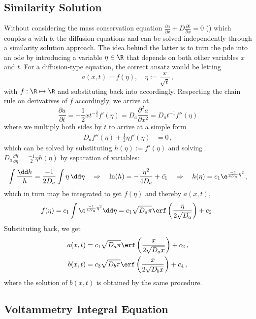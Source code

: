 \documentclass{prettytex/ox/mmsc-special-topic}
\begin{document}
  \subsection{Similarity Solution}
  Without considering the mass conservation equation $\frac{\partial a}{\partial x} + D \frac{\partial b}{\partial x} = 0$ () which couples $a$ with $b$, the diffusion equations  and  can be solved independently through a similarity solution approach.
  The idea behind the latter is to turn the \gls{pde} into an \gls{ode} by introducing a variable $\eta \in \R$ that depends on both other variables $x$ and $t$.
  For a diffusion-type equation, the correct ansatz would be letting
  $$a(x, t) = f(\eta), \quad \eta := \frac{x}{\sqrt{t}}\,,$$
  with $f: \R \mapsto \R$ and substituting back into  accordingly.
  Respecting the chain rule on derivatives of $f$ accordingly, we arrive at
  $$\frac{\partial a}{\partial t} = -\frac{1}{2} x t^{-\frac{3}{2}} f'(\eta) = D_a \frac{\partial^2 a}{\partial x^2} = D_a t^{-1} f''(\eta)$$
  where we multiply both sides by $t$ to arrive at a simple form
  \begin{align}
    \label{eq:similarity-solution-ode} D_a f''(\eta) + \frac{1}{2} \eta f'(\eta) & = 0\,,
  \end{align}
  which can be solved by substituting $h(\eta) := f'(\eta)$ and solving $D_a \frac{\dd h}{\dd \eta} = \frac{-1}{2} \eta h(\eta)$ by separation of variables:
  $$\int\frac{\dd h}{h} = \frac{-1}{2D_a} \int \eta \,\dd\eta \quad \Rightarrow \quad \ln(h) = -\frac{\eta^2}{4D_a} + \tilde{c_1} \quad\Rightarrow\quad h(\eta) = c_1 \e^{\frac{-1}{4D_a}\eta^2}\,,$$
  which in turn may be integrated to get $f(\eta)$ and thereby $a(x, t)$,
  $$f(\eta) = c_1 \int \e^{\frac{-1}{4D_a}\eta^2} \dd\eta = c_1 \sqrt{D_a \pi} \erf\left(\frac{\eta}{2 \sqrt{D_a}}\right) + c_2\,.$$
  Substituting back, we get
  \begin{align}
    a(x, t) & = c_1 \sqrt{D_a \pi} \erf\left(\frac{x}{2 \sqrt{D_a x}}\right) + c_2\,, \\
    b(x, t) & = c_3 \sqrt{D_b \pi} \erf\left(\frac{x}{2 \sqrt{D_b x}}\right) + c_4\,,
  \end{align}
  where the solution of $b(x, t)$ is obtained by the same procedure.

  \subsection{Voltammetry Integral Equation}
\end{document}

